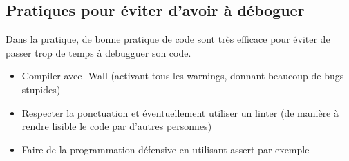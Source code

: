 \subsection{Pratiques pour éviter d'avoir à déboguer}


Dans la pratique, de bonne pratique de code sont très efficace pour éviter de passer trop de temps à debugguer son code.

\begin{itemize}[label=$\star$]
	\item Compiler avec -Wall (activant tous les warnings, donnant beaucoup de bugs stupides)

	\item Respecter la ponctuation et éventuellement utiliser un linter (de manière à rendre lisible le code par d'autres personnes)

	\item Faire de la programmation défensive en utilisant assert par exemple
\end{itemize}

